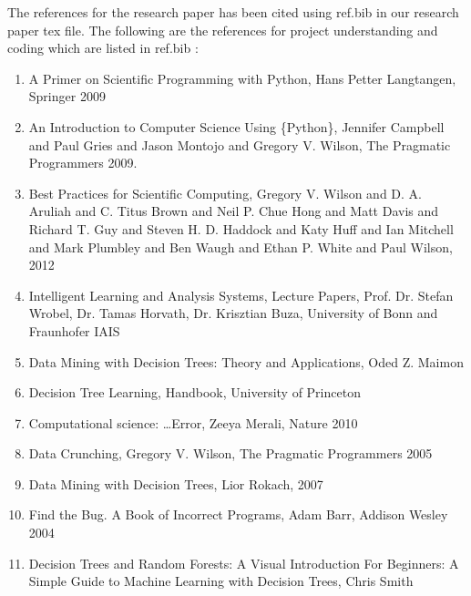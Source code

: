 \documentclass[a4paper,11pt,english]{sphinxmanual}
\begin{document}
The references for the research paper has been cited using ref.bib in our research paper tex file. The following are the references for project understanding and coding which are listed in ref.bib :
\begin{enumerate}
\def\theenumi{\arabic{enumi}}
\def\labelenumi{\theenumi .}
\makeatletter\def\p@enumii{\p@enumi \theenumi .}\makeatother
\item {} 
A Primer on Scientific Programming with Python, Hans Petter Langtangen, Springer 2009

\item {} 
An Introduction to Computer Science Using \{Python\}, Jennifer Campbell and Paul Gries and Jason Montojo and Gregory V. Wilson, The Pragmatic Programmers 2009.

\item {} 
Best Practices for Scientific Computing, Gregory V. Wilson and D. A. Aruliah and C. Titus Brown and Neil P. Chue Hong and Matt Davis and Richard T. Guy and Steven H. D. Haddock and Katy Huff and Ian Mitchell and Mark Plumbley and Ben Waugh and Ethan P. White and Paul Wilson, 2012

\item {} 
Intelligent Learning and Analysis Systems, Lecture Papers, Prof. Dr. Stefan Wrobel, Dr. Tamas Horvath, Dr. Krisztian Buza, University of Bonn and Fraunhofer IAIS

\item {} 
Data Mining with Decision Trees: Theory and Applications, Oded Z. Maimon

\item {} 
Decision Tree Learning, Handbook, University of Princeton

\item {} 
Computational science: …Error, Zeeya Merali, Nature 2010

\item {} 
Data Crunching, Gregory V. Wilson, The Pragmatic Programmers 2005

\item {} 
Data Mining with Decision Trees, Lior Rokach, 2007

\item {} 
Find the Bug. A Book of Incorrect Programs, Adam Barr, Addison Wesley 2004

\item {} 
Decision Trees and Random Forests: A Visual Introduction For Beginners: A Simple Guide to Machine Learning with Decision Trees, Chris Smith

\end{enumerate}
\end{document}
